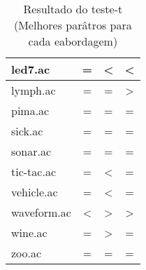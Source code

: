 \begin{table}[htbp]
\begin{tabular}{|l|c|c|c|}
		\hline
		led7.ac                 & =                     & <                     & <                     \\
		\hline
		lymph.ac                & =                     & =                     & >                     \\
		\hline
		pima.ac                 & =                     & =                     & =                     \\
		\hline
		sick.ac                 & =                     & =                     & =                     \\
		\hline
		sonar.ac                & =                     & =                     & =                     \\
		\hline
		tic-tac.ac              & =                     & <                     & =                     \\
		\hline
		vehicle.ac              & =                     & <                     & =                     \\
		\hline
		waveform.ac             & <                     & >                     & >                     \\
		\hline
		wine.ac                 & =                     & >                     & =                     \\
		\hline
		zoo.ac                  & =                     & =                     & =                     \\
		\hline
		\end{tabular}
	\caption{Resultado do teste-t (Melhores parâtros para cada eabordagem)}
	\label{tab:ttest_best}
\end{table}